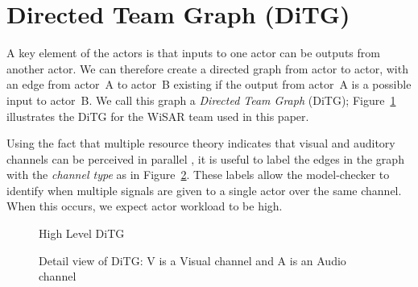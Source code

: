 \section{Directed Team Graph (DiTG)}
A key element of the actors is that inputs to one actor can be outputs from another actor.  We can therefore create a directed graph from actor to actor, with an edge from actor~A to actor~B existing if the output from actor~A is a possible input to actor~B.  We call this graph a {\em Directed Team Graph} (DiTG); Figure~\ref{fig:ditg} illustrates the DiTG for the WiSAR team used in this paper.   

Using the fact that multiple resource theory indicates that visual and auditory channels can be perceived in parallel \cite{wickens2002multiple}, it is useful to label the edges in the graph with the {\em channel type} as in Figure~\ref{fig:ditg_detail}.  These labels allow the model-checker to identify when multiple signals are given to a single actor over the same channel.  When this occurs, we expect actor workload to be high.


\begin{figure}[hbt]
\center
\setlength{\abovecaptionskip}{1mm}
\setlength{\belowcaptionskip}{1mm}
\setlength{\textfloatsep}{1mm}
\setlength{\floatsep}{1mm}
\caption{High Level DiTG}
\label{fig:ditg}
\end{figure}

\begin{figure}[hbt]
\center
\setlength{\abovecaptionskip}{1mm}
\setlength{\belowcaptionskip}{1mm}
\setlength{\textfloatsep}{1mm}
\setlength{\floatsep}{1mm}
\caption{Detail view of DiTG: V is a Visual channel and A is an Audio channel}
\label{fig:ditg_detail}
\end{figure}

